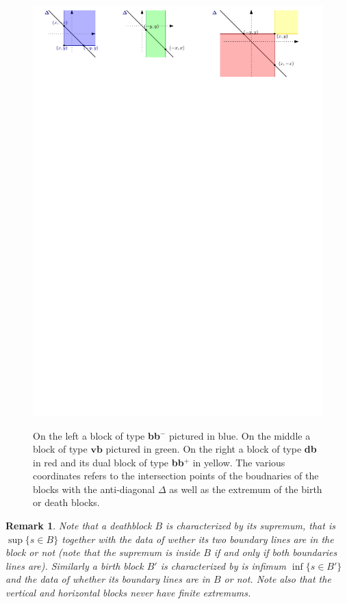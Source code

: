 \documentclass[a4paper, english, 11pt]{article}
\newcommand{\0}{\vec{0}}
\newtheorem{remark}[prop]{Remark}
\begin{document}
\begin{figure}
\begin{center}
\includegraphics[scale=0.9]{Blocks.pdf}\label{fig:blocks}
\caption{On the left a block of type \textbf{bb}$^{-}$ pictured in blue. On the middle a block of type $\textbf{vb}$ pictured in green. On the right 
a block of type \textbf{db} in red and its dual block of type \textbf{bb}$^{+}$ in yellow.
The various coordinates refers to the intersection points of the boudnaries of the blocks with the anti-diagonal $\Delta$ as well as the extremum of the birth or death blocks.}
\end{center}
\end{figure}
\begin{remark}\label{R;dualBlocks}
Note that a deathblock $B$ is characterized by its supremum, that is $\sup \{s\in B\}$ together with the data of wether its two boundary lines are in the block or not (note that the supremum is inside $B$ if and only if both boundaries lines are). Similarly a birth block $B'$  is characterized by is infimum $\inf \{s\in B'\}$ and the data of whether its boundary lines are in $B$ or not.  Note also that the vertical and horizontal blocks never have finite extremums.  
\end{remark}
\end{document}
